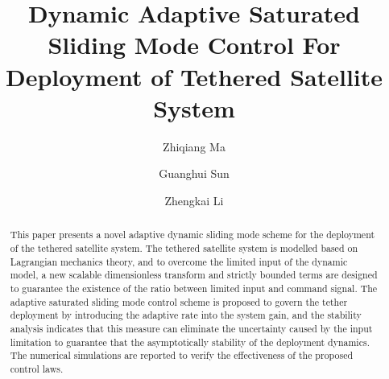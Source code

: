 \documentclass[Journal,letterpaper]{ascelike-new}
\theoremstyle{plain}
\theoremstyle{remark}
\begin{document}
\title{Dynamic Adaptive Saturated Sliding Mode Control For Deployment of Tethered Satellite System}

\author[2]{Zhiqiang Ma}
\author[1]{Guanghui Sun}
\author[2]{Zhengkai Li}


\maketitle

\begin{abstract}
This paper presents a novel adaptive dynamic sliding mode scheme for the deployment of the tethered satellite system. The tethered satellite system is modelled based on Lagrangian mechanics theory, and to overcome the limited input of the dynamic model, a new scalable dimensionless transform and strictly bounded terms are designed to guarantee the existence of the ratio between limited input and command signal. The adaptive saturated sliding mode control scheme is proposed to govern the tether deployment by introducing the adaptive rate into the system gain, and the stability analysis indicates that this measure can eliminate the uncertainty caused by the input limitation to guarantee that the asymptotically stability of the deployment dynamics. The numerical simulations are reported to verify the effectiveness of the proposed control laws.
\end{abstract}
\end{document}
